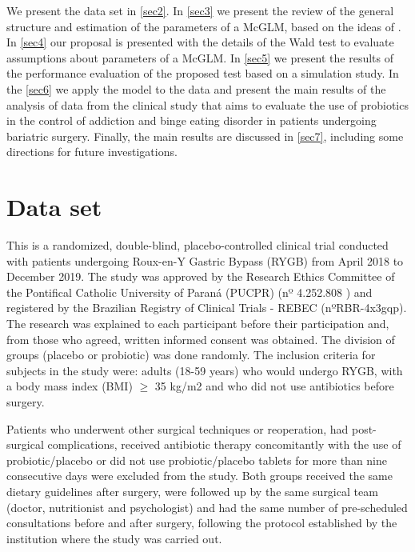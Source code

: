 \documentclass[AMA,STIX1COL]{WileyNJD-v2}
\begin{document}

We present the data set in \autoref{sec2}. In \autoref{sec3} we present the review of the general structure and estimation of the parameters of a McGLM, based on the ideas of \cite{Bonat16}. In \autoref{sec4} our proposal is presented with the details of the Wald test to evaluate assumptions about parameters of a McGLM. In \autoref{sec5} we present the results of the performance evaluation of the proposed test based on a simulation study. In the \autoref{sec6} we apply the model to the data and present the main results of the analysis of data from the clinical study that aims to evaluate the use of probiotics in the control of addiction and binge eating disorder in patients undergoing bariatric surgery. Finally, the main results are discussed in \autoref{sec7}, including some directions for future investigations.


\section{Data set}\label{sec2}


This is a randomized, double-blind, placebo-controlled clinical trial conducted with patients undergoing Roux-en-Y Gastric Bypass (RYGB) from April 2018 to December 2019. The study was approved by the Research Ethics Committee of the Pontifical Catholic University of Paraná (PUCPR) (nº 4.252.808 ) and registered by the Brazilian Registry of Clinical Trials - REBEC (nºRBR-4x3gqp). The research was explained to each participant before their participation and, from those who agreed, written informed consent was obtained. The division of groups (placebo or probiotic) was done randomly. The inclusion criteria for subjects in the study were: adults (18-59 years) who would undergo RYGB, with a body mass index (BMI) $\geq$ 35 kg/m2 and who did not use antibiotics before surgery. 

Patients who underwent other surgical techniques or reoperation, had post-surgical complications, received antibiotic therapy concomitantly with the use of probiotic/placebo or did not use probiotic/placebo tablets for more than nine consecutive days were excluded from the study. Both groups received the same dietary guidelines after surgery, were followed up by the same surgical team (doctor, nutritionist and psychologist) and had the same number of pre-scheduled consultations before and after surgery, following the protocol established by the institution where the study was carried out.
\end{document}

